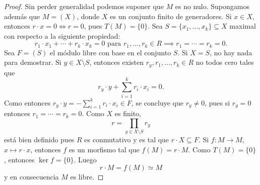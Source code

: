 \begin{proof}
Sin perder generalidad podemos suponer que $M$ es no nulo. Supongamos además que $M=(X)$, donde $X$ es un conjunto 
finito de generadores. Si $x\in X$, entonces $r\cdot x=0\Longleftrightarrow r=0$, pues $T(M)=\{0\}$. Sea $S=\{x_1,\dots,x_k\}\subseteq X$ 
maximal con respecto a la siguiente propiedad:
\[
r_1\cdot x_1+\cdots+r_k\cdot x_k=0\text{ para $r_1,\dots,r_k\in R$}\implies r_1=\cdots=r_k=0.
\]	
Sea $F=(S)$ el módulo libre con base en el conjunto $S$. Si $X=S$, no hay nada para demostrar. 
Si $y\in X\setminus S$, entonces
existen $r_y,r_1,\dots,r_k\in R$ no todos cero tales que
\[
r_y\cdot y+\sum_{i=1}^k r_i\cdot x_i=0.
\]
Como entonces $r_y\cdot y=-\sum_{i=1}^k r_i\cdot x_i\in F$, se concluye que $r_y\ne 0$, pues si 
$r_y=0$ entonces $r_1=\cdots=r_k=0$. Como $X$ es finito, 
\[
r=\prod_{y\in X\setminus S}r_y
\]
está bien definido pues $R$ es conmutativo y es tal que $r\cdot X\subseteq F$. Si $f\colon M\to M$, $x\mapsto r\cdot x$, entonces
$f$ es un morfismo tal que $f(M)=r\cdot M$. Como $T(M)=\{0\}$, entonces $\ker f=\{0\}$. Luego
\[
r\cdot M=f(M)\simeq M
\]
y en consecuencia $M$ es libre. 
\end{proof}



